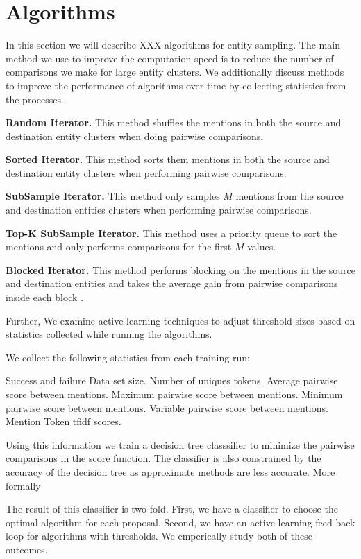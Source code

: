 
\section{Algorithms}

In this section we will describe XXX algorithms for entity sampling.
The main method we use to improve the computation speed is to reduce the
number of comparisons we make for large entity clusters.
We additionally discuss methods to improve the performance of algorithms
over time by collecting statistics from the processes.

\textbf{Random Iterator.} This method shuffles the mentions in both the
source and destination entity clusters when doing pairwise comparisons. 

\textbf{Sorted Iterator.} This method sorts them mentions in both the source
and destination entity clusters when performing pairwise comparisons.

\textbf{SubSample Iterator.} This method only samples $M$ mentions from the
source and destination entities clusters when performing pairwise comparisons.

\textbf{Top-K SubSample Iterator.} This method uses a priority queue to sort
the mentions and only performs comparisons for the first $M$ values.

\textbf{Blocked Iterator.} This method performs blocking on the mentions in the
source and destination entities and takes the average gain from pairwise
comparisons inside each block .


Further, We examine active learning techniques to adjust threshold sizes based on statistics collected while running the algorithms.

We collect the following statistics from each training run:

Success and failure
Data set size.
Number of uniques tokens.
Average pairwise score between mentions.
Maximum pairwise score between mentions.
Minimum pairwise score between mentions.
Variable pairwise score between mentions.
Mention Token tfidf scores.

Using this information we train a decision tree classsifier to minimize the 
pairwise comparisons in the score function.
The classifier is also constrained by the accuracy of the decision tree as 
approximate methods are less accurate.
More formally \ellipse

The result of this classifier is two-fold.
First, we have a classifier to choose the optimal algorithm for each proposal.
Second, we have an active learning feed-back loop for algorithms with 
thresholds.
We emperically study both of these outcomes.



